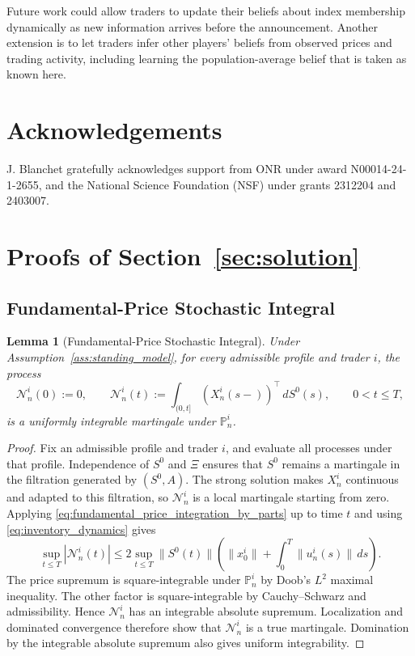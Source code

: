 \documentclass[12pt]{article}
\numberwithin{equation}{section}
\newtheorem{lemma}[theorem]{Lemma}
\theoremstyle{definition}
\begin{document}
Future work could allow traders to update their beliefs about index membership
dynamically as new information arrives before the announcement. Another
extension is to let traders infer other players' beliefs from observed prices
and trading activity, including learning the population-average belief that
is taken as known here.

\FloatBarrier

\section*{Acknowledgements}
J. Blanchet gratefully acknowledges support from ONR under award N00014-24-1-2655, and the National Science Foundation (NSF) under grants 2312204 and 2403007.




\clearpage
\appendix
\section{Proofs of Section~\ref{sec:solution}}\label{sec:proofs_solution}

\subsection{Fundamental-Price Stochastic Integral}
\label{subsec:proof_fundamental_price_stochastic_integral}

\begin{lemma}[Fundamental-Price Stochastic Integral]
\label{lem:fundamental_price_stochastic_integral}
Under Assumption~\ref{ass:standing_model}, for every admissible profile and
trader \(i\), the process
\[
\mathcal N_n^i(0):=0,
\qquad
\mathcal N_n^i(t)
:=
\int_{(0,t]}(X_n^i(s-))^\top\,dS^0(s),
\qquad 0<t\leq T,
\]
is a uniformly integrable martingale under \(\mathbb P_n^i\).
\end{lemma}

\begin{proof}
Fix an admissible profile and trader \(i\), and evaluate all processes under
that profile. Independence of \(S^0\) and \(\Xi\) ensures that \(S^0\) remains
a martingale in the filtration generated by \((S^0,A)\). The strong solution
makes \(X_n^i\) continuous and adapted to this filtration, so
\(\mathcal N_n^i\) is a local martingale starting from zero. Applying
\eqref{eq:fundamental_price_integration_by_parts} up to time \(t\) and using
\eqref{eq:inventory_dynamics} gives
\[
\sup_{t\leq T}|\mathcal N_n^i(t)|
\leq
2\sup_{t\leq T}\lVert S^0(t)\rVert
\left(\lVert x_0^i\rVert+\int_0^T\lVert u_n^i(s)\rVert\,ds\right).
\]
The price supremum is square-integrable under \(\mathbb P_n^i\) by Doob's
\(L^2\) maximal inequality. The other factor is square-integrable by
Cauchy--Schwarz and admissibility. Hence \(\mathcal N_n^i\) has an integrable
absolute supremum. Localization and dominated convergence therefore show that
\(\mathcal N_n^i\) is a true martingale. Domination by the integrable absolute
supremum also gives uniform integrability.
\end{proof}
\end{document}
